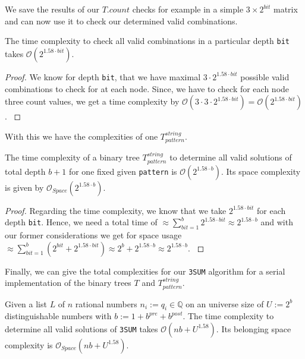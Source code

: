 We save the results of our $T.count$ checks for example in a simple $3 \times 2^{bit}$ matrix and can now use it to check our determined valid combinations.

\begin{lemma}
    The time complexity to check all valid combinations in a particular depth \texttt{bit} takes $\mathcal{O}\left(2^{1.58 \cdot bit}\right)$.
\label{lemma:checkofvalidcombinationscompl}
\end{lemma}


\begin{proof}
    We know for depth \texttt{bit}, that we have maximal $3 \cdot 2^{1.58 \cdot bit}$ possible valid combinations to check for at each node. Since, we have to check for each node three count values, we get a time complexity by $\mathcal{O}\left(3 \cdot 3 \cdot 2^{1.58 \cdot bit}\right) = \mathcal{O}\left(2^{1.58 \cdot bit}\right)$.
\label{proof:checksofvalidcombinationscompl}
\end{proof}

With this we have the complexities of one $T^{string}_{pattern}$.

\begin{theorem}
    The time complexity of a binary tree $T^{string}_{pattern}$ to determine all valid solutions of total depth $b + 1$ for one fixed given \texttt{pattern} is $\mathcal{O}\left(2^{1.58 \cdot b}\right)$. Its space complexity is given by $\mathcal{O}_{Space}\left(2^{1.58 \cdot b}\right)$.
\label{theorem:complexitiesofTstringpattern}
\end{theorem}


\begin{proof}
    Regarding the time complexity, we know that we take $2^{1.58 \cdot bit}$ for each depth \texttt{bit}. Hence, we need a total time of $\approx \sum_{bit = 1}^{b} 2^{1.58 \cdot bit} \approx 2^{1.58 \cdot b}$ and with our former considerations we get for space usage $\approx \sum_{bit = 1}^{b} \left(2^{bit} + 2^{1.58 \cdot bit}\right) \approx 2^{b} + 2^{1.58 \cdot b} \approx 2^{1.58 \cdot b}$.
\label{proof:complexitiesofTstringpattern}
\end{proof}

Finally, we can give the total complexities for our \texttt{3SUM} algorithm for a serial implementation of the binary trees $T$ and $T^{string}_{pattern}$.

\begin{theorem}
    Given a list $L$ of $n$ rational numbers $n_{i} := q_{i} \in \mathbb{Q}$ on an universe size of $U := 2^{b}$ distinguishable numbers with $b := 1 + b^{pre} + b^{post}$. The time complexity to determine all valid solutions of \texttt{3SUM} takes $\mathcal{O}\left(nb + U^{1.58}\right)$. Its belonging space complexity is $\mathcal{O}_{Space}\left(nb + U^{1.58}\right)$.
\label{theorem:complexitiesof3sumrationalnumbers}
\end{theorem}


